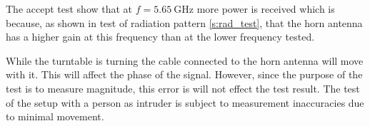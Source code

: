 The accept test show that at $f=\SI{5.65}{\giga\hertz}$ more power is received which is because, as shown in test of radiation pattern \ref{s:rad_test}, that the horn antenna has a higher gain at this frequency than at the lower frequency tested. 

While the turntable is turning the cable connected to the horn antenna will move with it. This will affect the phase of the signal. However, since the purpose of the test is to measure magnitude, this error is will not effect the test result. The test of the setup with a person as intruder is subject to measurement inaccuracies due to minimal movement.